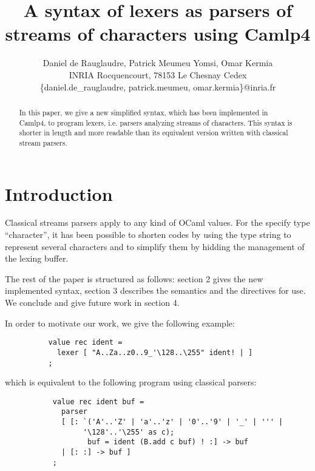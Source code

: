 \documentclass[11pt]{article}
\begin{document}
\title{A syntax of lexers as parsers of streams of characters using Camlp4}
\date{}
\author{Daniel de Rauglaudre, Patrick Meumeu Yomsi, Omar Kermia\\
INRIA Rocquencourt,
78153 Le Chesnay Cedex \\
\{daniel.de\_rauglaudre, patrick.meumeu, omar.kermia\}@inria.fr}

\thispagestyle{empty}

\maketitle

\begin{abstract}
In this paper, we give a new simplified syntax, which has been
implemented in Camlp4, to program lexers, i.e. parsers analyzing
streams of characters. This syntax is shorter in length and more
readable than its equivalent version written with classical stream
parsers.
\end{abstract}

\section{Introduction}

Classical streams parsers apply to any kind of OCaml values. For
the specify type ``character'', it has been possible to shorten codes by
using the type string to represent several characters and to simplify
them by hidding the management of the lexing buffer.

The rest of the paper is structured as follows: section 2 gives the
new implemented syntax, section 3 describes the semantics and the
directives for use. We conclude and give future work in section 4.

In order to motivate our work, we give the following example:

\begin{verbatim}
          value rec ident =
            lexer [ "A..Za..z0..9_'\128..\255" ident! | ]
          ;
\end{verbatim}

which is equivalent to the following program using classical parsers:

\begin{verbatim}
           value rec ident buf =
             parser
             [ [: `('A'..'Z' | 'a'..'z' | '0'..'9' | '_' | ''' |
                  '\128'..'\255' as c);
                   buf = ident (B.add c buf) ! :] -> buf
             | [: :] -> buf ]
           ;
\end{verbatim}
\end{document}
